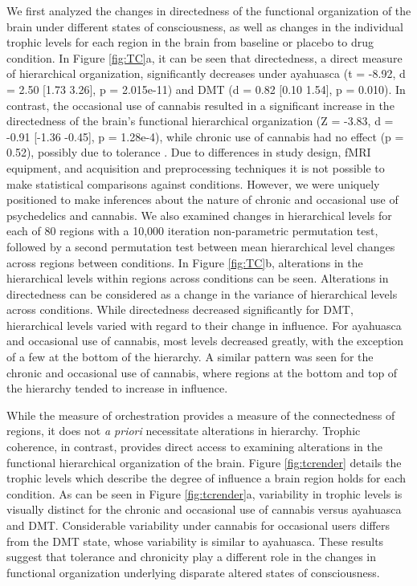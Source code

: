 We first analyzed the changes in directedness of the functional
organization of the brain under different states of consciousness, as
well as changes in the individual trophic levels for each region in
the brain from baseline or placebo to drug condition. In Figure \ref{fig:TC}a, it
can be seen that directedness, a direct measure of hierarchical organization,
significantly decreases under ayahuasca (t = -8.92, d = 2.50 [1.73 3.26], p = 2.015e-11) and DMT (d = 0.82 [0.10 1.54], p = 0.010).
In contrast, the occasional use of cannabis resulted in a significant
increase in the directedness of the brain's functional hierarchical
organization (Z = -3.83, d = -0.91 [-1.36 -0.45], p = 1.28e-4), while chronic use of cannabis had no
effect (p = 0.52), possibly due to tolerance \parencite{Ramaekers2022}. Due to differences in study design,
fMRI equipment, and acquisition and preprocessing techniques it is not
possible to make statistical comparisons against conditions. However, we
were uniquely positioned to make inferences about the nature of chronic
and occasional use of psychedelics and cannabis. We also examined changes in hierarchical levels
for each of 80 regions with a 10,000 iteration non-parametric permutation test, followed
by a second permutation test between mean hierarchical level changes across regions between conditions.
In Figure \ref{fig:TC}b, alterations in the hierarchical levels within regions across conditions can be seen. Alterations in directedness
can be considered as a change in the variance of hierarchical levels across conditions.
While directedness decreased significantly for DMT, hierarchical levels varied with regard
to their change in influence. For ayahuasca and occasional use of cannabis, most levels decreased greatly, with the exception
of a few at the bottom of the hierarchy. A similar pattern was seen for the chronic and occasional use of cannabis, where
regions at the bottom and top of the hierarchy tended to increase in influence.

While the measure of orchestration provides a measure of the connectedness of regions, it does not \textit{a priori}
necessitate alterations in hierarchy. 
Trophic coherence, in contrast, provides direct access to
examining alterations in the functional hierarchical organization of the brain. Figure 
\ref{fig:tcrender} details the trophic levels which describe 
the degree of influence a brain region holds for each 
condition. As can be seen in Figure \ref{fig:tcrender}a, 
variability in trophic levels is visually distinct for the chronic and 
occasional use of cannabis versus ayahuasca and DMT. Considerable variability under cannabis for occasional users 
differs from the DMT state, whose variability is similar to 
ayahuasca. These results suggest that tolerance and chronicity 
play a different role in the changes in functional organization 
underlying disparate
altered states of consciousness. 

